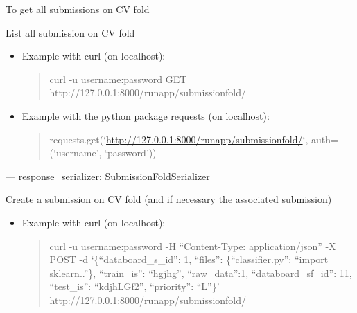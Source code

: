 \documentclass[letterpaper,10pt,english]{sphinxmanual}
\begin{document}
\begin{fulllineitems}
\label{modules/views:runapp.views.SubmissionFoldList}
To get all submissions on CV fold

\begin{fulllineitems}
\label{modules/views:runapp.views.SubmissionFoldList.get}
List all submission on CV fold
\begin{itemize}
\item {} 
Example with curl (on localhost):
\begin{quote}

curl -u username:password GET            http://127.0.0.1:8000/runapp/submissionfold/
\end{quote}

\item {} 
Example with the python package requests (on localhost):
\begin{quote}

requests.get(`\url{http://127.0.0.1:8000/runapp/submissionfold/}`,            auth=(`username', `password'))
\end{quote}

\end{itemize}

---
response\_serializer: SubmissionFoldSerializer

\end{fulllineitems}


\begin{fulllineitems}
\label{modules/views:runapp.views.SubmissionFoldList.post}
Create a submission on CV fold (and if necessary the associated        submission)
\begin{itemize}
\item {} 
Example with curl (on localhost):
\begin{quote}

curl -u username:password   -H ``Content-Type: application/json''            -X POST            -d `\{``databoard\_s\_id'': 1, ``files'': \{``classifier.py'':                ``import sklearn..''\}, ``train\_is'': ``hgjhg'', ``raw\_data'':1,                ``databoard\_sf\_id'': 11, ``test\_is'': ``kdjhLGf2'',                ``priority'': ``L''\}'                http://127.0.0.1:8000/runapp/submissionfold/


\end{quote}
\end{itemize}
\end{fulllineitems}
\end{fulllineitems}
\end{document}
